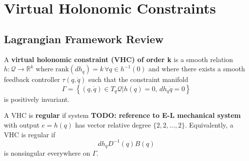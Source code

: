 
\section{Virtual Holonomic Constraints}\label{sec:vhcs}

\subsection{Lagrangian Framework Review}%
\label{sub:lagrangian_vhcs}

\begin{defn}\label{defn:vhc_order_k}
   A \textbf{virtual holonomic constraint (VHC) of order k} is a smooth relation 
   \( h : \mathcal{Q} \rightarrow \mathbb{R}^k\) where
   \( \text{rank}(dh_q) = k \, \forall q \in h^{-1}(0)\) and where there exists
   a smooth feedback controller \(\tau(q,\dot{q})\) such that the constraint
   manifold
   \[
      \Gamma = \left\{ (q,\dot{q}) \in T_q\mathcal{Q} \vert h(q) = 0, \, 
      dh_q \dot{q} = 0\right\}
   \]
   is positively invariant.
\end{defn}

\begin{defn}\label{defn:vhc_regular}
   A VHC is \textbf{regular} if system \textbf{TODO:
   reference to E-L mechanical system} with output \(e = h(q)\) has vector
   relative degree \(\{2,2,\ldots,2\}\).
   Equivalently, a VHC is regular if 
   \[
      dh_q D^{-1}(q)B(q)
   \]
   is nonsingular everywhere on \(\Gamma\).
\end{defn}

